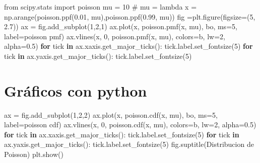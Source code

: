 \documentclass[
  letterpaper,
  DIV=11,
  numbers=noendperiod]{scrreprt}
\newenvironment{Shaded}{\begin{snugshade}}{\end{snugshade}}
\newcommand{\CommentTok}[1]{\textcolor[rgb]{0.37,0.37,0.37}{#1}}
\newcommand{\ControlFlowTok}[1]{\textcolor[rgb]{0.00,0.23,0.31}{\textbf{#1}}}
\newcommand{\DecValTok}[1]{\textcolor[rgb]{0.68,0.00,0.00}{#1}}
\newcommand{\FloatTok}[1]{\textcolor[rgb]{0.68,0.00,0.00}{#1}}
\newcommand{\ImportTok}[1]{\textcolor[rgb]{0.00,0.46,0.62}{#1}}
\newcommand{\KeywordTok}[1]{\textcolor[rgb]{0.00,0.23,0.31}{\textbf{#1}}}
\newcommand{\NormalTok}[1]{\textcolor[rgb]{0.00,0.23,0.31}{#1}}
\newcommand{\OperatorTok}[1]{\textcolor[rgb]{0.37,0.37,0.37}{#1}}
\newcommand{\StringTok}[1]{\textcolor[rgb]{0.13,0.47,0.30}{#1}}
\begin{document}
\begin{Shaded}
\begin{Highlighting}[]
\ImportTok{from}\NormalTok{ scipy.stats }\ImportTok{import}\NormalTok{ poisson}
\NormalTok{mu }\OperatorTok{=} \DecValTok{10} \CommentTok{\# mu = lambda}
\NormalTok{x }\OperatorTok{=}\NormalTok{ np.arange(poisson.ppf(}\FloatTok{0.01}\NormalTok{, mu),poisson.ppf(}\FloatTok{0.99}\NormalTok{, mu))}
\NormalTok{fig }\OperatorTok{=}\NormalTok{plt.figure(figsize}\OperatorTok{=}\NormalTok{(}\DecValTok{5}\NormalTok{, }\FloatTok{2.7}\NormalTok{))}
\NormalTok{ax }\OperatorTok{=}\NormalTok{ fig.add\_subplot(}\DecValTok{1}\NormalTok{,}\DecValTok{2}\NormalTok{,}\DecValTok{1}\NormalTok{)}
\NormalTok{ax.plot(x, poisson.pmf(x, mu), }\StringTok{\textquotesingle{}bo\textquotesingle{}}\NormalTok{, ms}\OperatorTok{=}\DecValTok{5}\NormalTok{, label}\OperatorTok{=}\StringTok{\textquotesingle{}poisson pmf\textquotesingle{}}\NormalTok{)}
\NormalTok{ax.vlines(x, }\DecValTok{0}\NormalTok{, poisson.pmf(x, mu), colors}\OperatorTok{=}\StringTok{\textquotesingle{}b\textquotesingle{}}\NormalTok{, lw}\OperatorTok{=}\DecValTok{2}\NormalTok{, alpha}\OperatorTok{=}\FloatTok{0.5}\NormalTok{)}
\ControlFlowTok{for}\NormalTok{ tick }\KeywordTok{in}\NormalTok{ ax.xaxis.get\_major\_ticks():}
\NormalTok{  tick.label.set\_fontsize(}\DecValTok{5}\NormalTok{)}
\ControlFlowTok{for}\NormalTok{ tick }\KeywordTok{in}\NormalTok{ ax.yaxis.get\_major\_ticks(): }
\NormalTok{  tick.label.set\_fontsize(}\DecValTok{5}\NormalTok{) }
\end{Highlighting}
\end{Shaded}

\section{Gráficos con python}\label{gruxe1ficos-con-python-3}

\begin{Shaded}
\begin{Highlighting}[]
\NormalTok{ax }\OperatorTok{=}\NormalTok{ fig.add\_subplot(}\DecValTok{1}\NormalTok{,}\DecValTok{2}\NormalTok{,}\DecValTok{2}\NormalTok{)}
\NormalTok{ax.plot(x, poisson.cdf(x, mu), }\StringTok{\textquotesingle{}bo\textquotesingle{}}\NormalTok{, ms}\OperatorTok{=}\DecValTok{5}\NormalTok{, label}\OperatorTok{=}\StringTok{\textquotesingle{}poisson cdf\textquotesingle{}}\NormalTok{)}
\NormalTok{ax.vlines(x, }\DecValTok{0}\NormalTok{, poisson.cdf(x, mu), colors}\OperatorTok{=}\StringTok{\textquotesingle{}b\textquotesingle{}}\NormalTok{, lw}\OperatorTok{=}\DecValTok{2}\NormalTok{, alpha}\OperatorTok{=}\FloatTok{0.5}\NormalTok{)}
\ControlFlowTok{for}\NormalTok{ tick }\KeywordTok{in}\NormalTok{ ax.xaxis.get\_major\_ticks():}
\NormalTok{  tick.label.set\_fontsize(}\DecValTok{5}\NormalTok{)}
\ControlFlowTok{for}\NormalTok{ tick }\KeywordTok{in}\NormalTok{ ax.yaxis.get\_major\_ticks():}
\NormalTok{  tick.label.set\_fontsize(}\DecValTok{5}\NormalTok{)}
\NormalTok{fig.suptitle(}\StringTok{\textquotesingle{}Distribucion de Poisson\textquotesingle{}}\NormalTok{)}
\NormalTok{plt.show()}
\end{Highlighting}
\end{Shaded}
\end{document}
